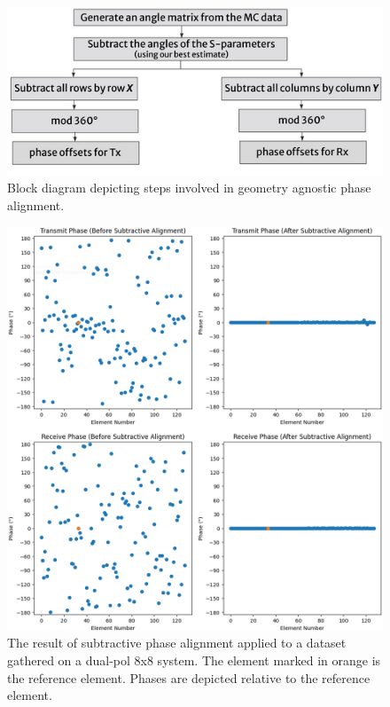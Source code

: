 \documentclass[journal]{IEEEtran}
\begin{document}
\begin{figure}[ht]
    \centering
    \includegraphics[width=0.95\linewidth]{phaseAlignFlowchart.png}
    \caption{Block diagram depicting steps involved in geometry agnostic phase alignment.}
    \label{fig:PAflowchart}
\end{figure}

\begin{figure}
    \centering
    \includegraphics[width=0.95\linewidth]{subtraction-dualpole.png}
    \caption{The result of subtractive phase alignment applied to a dataset gathered on a dual-pol 8x8 system. The element marked in orange is the reference element. Phases are depicted relative to the reference element.}
    \label{fig:subtractResults}
\end{figure}
\end{document}
